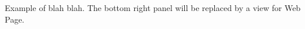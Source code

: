 \label{fig:ldviews}
Example of blah blah. The bottom right panel will be replaced by a view for Web Page.